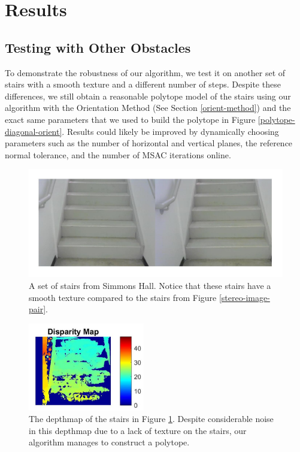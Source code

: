 
\section{Results}

\subsection{Testing with Other Obstacles}

To demonstrate the robustness of our algorithm, we test it on another set of stairs with a smooth texture and a different number of steps. Despite these differences, we still obtain a reasonable polytope model of the stairs using our algorithm with the Orientation Method (See Section \ref{orient-method}) and the exact same parameters that we used to build the polytope in Figure \ref{polytope-diagonal-orient}. Results could likely be improved by dynamically choosing parameters such as the number of horizontal and vertical planes, the reference normal tolerance, and the number of MSAC iterations online.

\begin{figure}[!h]
\centering
\includegraphics[width=\columnwidth]{Sections/Figures/simmons-stereo-pair.jpg}
\caption{A set of stairs from Simmons Hall. Notice that these stairs have a smooth texture compared to the stairs from Figure \ref{stereo-image-pair}.}
\label{simmons-pair}
\end{figure}

\begin{figure}[!h]
\centering
\includegraphics[width=2in]{Sections/Figures/simmons-stairs-depthmap.jpg}
\caption{The depthmap of the stairs in Figure \ref{simmons-pair}. Despite considerable noise in this depthmap due to a lack of texture on the stairs, our algorithm manages to construct a polytope.}
\label{simmons-depthmap}
\end{figure}

